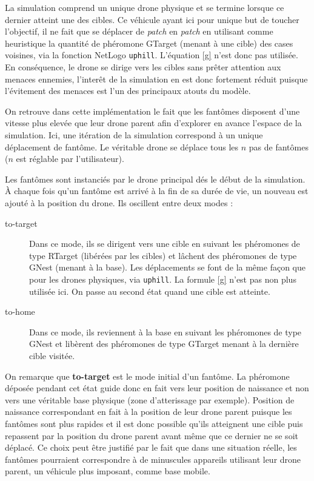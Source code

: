\documentclass[12pt]{article}
\begin{document}
La simulation comprend un unique drone physique et se termine lorsque
ce dernier atteint une des cibles. Ce véhicule ayant ici pour unique
but de toucher l'objectif, il ne fait que se déplacer de
\textit{patch} en \textit{patch} en utilisant comme heuristique la
quantité de phéromone GTarget (menant à une cible) des cases voisines,
via la fonction NetLogo \texttt{uphill}. L'équation \ref{g} n'est donc
pas utilisée. En conséquence, le drone se dirige vers les cibles sans
prêter attention aux menaces ennemies, l'interêt de la simulation en
est donc fortement réduit puisque l'évitement des menaces est l'un des
principaux atouts du modèle.

On retrouve dans cette implémentation le fait que les fantômes
disposent d'une vitesse plus elevée que leur drone parent afin
d'explorer en avance l'espace de la simulation. Ici, une itération de
la simulation correspond à un unique déplacement de fantôme. Le
véritable drone se déplace tous les $n$ pas de fantômes ($n$ est
réglable par l'utilisateur).

Les fantômes sont instanciés par le drone principal dés le début de la
simulation. \`A chaque fois qu'un fantôme est arrivé à la fin de sa
durée de vie, un nouveau est ajouté à la position du drone. Ils
oscillent entre deux modes :

\begin{description}

  \item[to-target]{Dans ce mode, ils se dirigent vers une cible en
    suivant les phéromones de type RTarget (libérées par les cibles)
    et lâchent des phéromones de type GNest (menant à la base). Les
    déplacements se font de la même façon que pour les drones
    physiques, via \texttt{uphill}. La formule \ref{g} n'est pas non
    plus utilisée ici. On passe au second état quand une cible est
    atteinte.}

  \item[to-home]{Dans ce mode, ils reviennent à la base en suivant les
    phéromones de type GNest et libèrent des phéromones de type
    GTarget menant à la dernière cible visitée.}

\end{description}

On remarque que \textbf{to-target} est le mode initial d'un
fantôme. La phéromone déposée pendant cet état guide donc en fait vers
leur position de naissance et non vers une véritable base physique
(zone d'atterissage par exemple). Position de naissance correspondant
en fait à la position de leur drone parent puisque les fantômes sont
plus rapides et il est donc possible qu'ils atteignent une cible puis
repassent par la position du drone parent avant même que ce dernier ne
se soit déplacé. Ce choix peut être justifié par le fait que dans une
situation réelle, les fantômes pourraient correspondre à de minuscules
appareils utilisant leur drone parent, un véhicule plus imposant,
comme base mobile.
\end{document}
